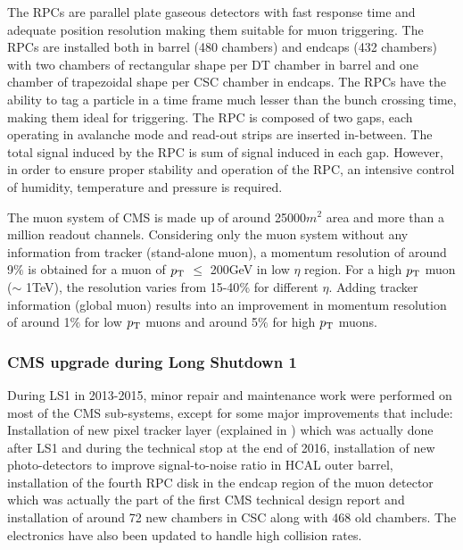 The RPCs are parallel plate gaseous detectors with fast response time and adequate position resolution making them suitable for
muon triggering. The RPCs are installed both in barrel (480 chambers)
and endcaps (432 chambers) with two chambers of rectangular shape per DT chamber in barrel and one chamber of trapezoidal shape per CSC chamber in endcaps.
The RPCs have the ability to tag a particle in a time frame much lesser than the bunch crossing time, making them ideal for triggering. The RPC is composed of
two gaps, each operating in avalanche mode and read-out strips are inserted in-between. The total signal induced by the RPC is sum of signal induced in each gap.
However, in order to ensure proper stability and operation of the RPC, an intensive control  of humidity, temperature and pressure is required.  

The muon system of CMS is made up of around 25000$\unit{m^{2}}$ area and more than a million readout channels.
Considering only the muon system without any information from
tracker (stand-alone muon), a momentum resolution of around 9$\%$ is obtained for a muon of $p_{\mathrm T}$ $\leq$ 200\unit{GeV}
in low $\eta$ region. For a high $p_{\mathrm T}$ muon ($\sim$ 1\unit{TeV}), the resolution varies from 15-40$\%$ for different $\eta$.
Adding tracker information (global muon) results into an improvement in momentum resolution of around 1$\%$ for low $p_{\mathrm T}$ muons and around
5$\%$ for high $p_{\mathrm T}$ muons. 


\subsubsection{CMS upgrade during Long Shutdown 1}
During LS1 in 2013-2015, minor repair and maintenance work were performed on most of the CMS sub-systems, except for
some major improvements that include: Installation of new pixel tracker layer (explained in \sectn{\ref{Se:CMS_tracker}}) which was actually
done after LS1 and during the technical stop at the
end of 2016, installation of new photo-detectors to improve signal-to-noise ratio in HCAL outer barrel, installation of the fourth RPC disk in the endcap region of
the muon detector which was actually the part of the first CMS technical design report and installation of around 72 new chambers in CSC along with 468 old chambers.
The electronics have also been updated to handle high collision rates.

